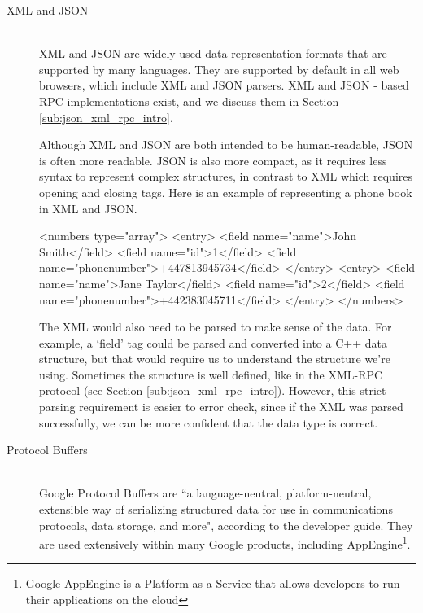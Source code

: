 \begin{description}
	\item[XML and JSON] 
	~\\
	XML and JSON are widely used data representation formats that are supported by many languages. They are supported by default in all web browsers, which include XML and JSON parsers. XML and JSON - based RPC implementations exist, and we discuss them in Section \ref{sub:json_xml_rpc_intro}.

	Although XML and JSON are both intended to be human-readable, JSON is often more readable. JSON is also more compact, as it requires less syntax to represent complex structures, in contrast to XML which requires opening and closing tags. Here is an example of representing a phone book in XML and JSON.

	\begin{code}
	\end{code}
	\begin{code}
<numbers type="array">
    <entry>
    	<field name="name">John Smith</field>
    	<field name="id">1</field>
    	<field name="phonenumber">+447813945734</field>
    </entry>
    <entry>
    	<field name="name">Jane Taylor</field>
    	<field name="id">2</field>
    	<field name="phonenumber">+442383045711</field>
    </entry>
</numbers>
	\end{code}

	The XML would also need to be parsed to make sense of the data. For example, a `field' tag could be parsed and converted into a C++ data structure, but that would require us to understand the structure we're using. Sometimes the structure is well defined, like in the XML-RPC protocol (see Section \ref{sub:json_xml_rpc_intro}). However, this strict parsing requirement is easier to error check, since if the XML was parsed successfully, we can be more confident that the data type is correct. 

	\item[Protocol Buffers] 
	~\\
	Google Protocol Buffers are ``a language-neutral, platform-neutral, extensible way of serializing structured data for use in communications protocols, data storage, and more", according to the developer guide\cite{protobufdev}. They are used extensively within many Google products, including AppEngine\footnote{Google AppEngine is a Platform as a Service that allows developers to run their applications on the cloud}. 


\end{description}
